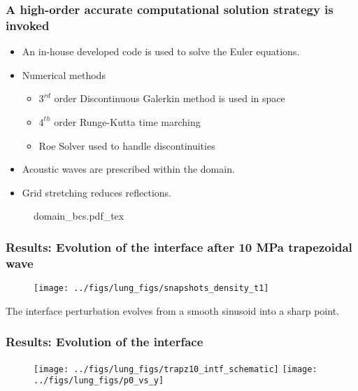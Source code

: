 \begin{frame} \frametitle{A high-order accurate computational solution strategy is invoked}
  \begin{minipage}{0.62\textwidth}
    \begin{itemize}
    \item An in-house developed code is used to solve the Euler equations.
    \item Numerical methods
      \begin{itemize}
      \item $3^{rd}$ order Discontinuous Galerkin method is used in space
      \item $4^{th}$ order Runge-Kutta time marching
      \item Roe Solver used to handle discontinuities
      \end{itemize}
    \item Acoustic waves are prescribed within the domain.
    \item Grid stretching reduces reflections.
    \end{itemize}
  \end{minipage}
  \hfill%
  \begin{minipage}{0.34\textwidth}
    \begin{figure}
      \centering
      \def\svgwidth{\textwidth}
      {\footnotesize
        {domain_bcs.pdf_tex}%
      }
    \end{figure}
  \end{minipage}

\end{frame}
\begin{frame} \frametitle{\vspace*{0.5cm}Results: Evolution of the interface after 10 MPa trapezoidal wave}
  \begin{figure}
    \centering
    \texttt{[image: ../figs/lung\_figs/snapshots\_density\_t1]}
  \end{figure}
  {\small
    The interface perturbation evolves from a smooth sinusoid into a sharp point.
  }
\end{frame}
\begin{frame} \frametitle{\vspace*{0.5cm}Results: Evolution of the interface}
  \begin{figure}
    \centering
    \texttt{[image: ../figs/lung\_figs/trapz10\_intf\_schematic]}
    \texttt{[image: ../figs/lung\_figs/p0\_vs\_y]}%
  \end{figure}
\end{frame}
